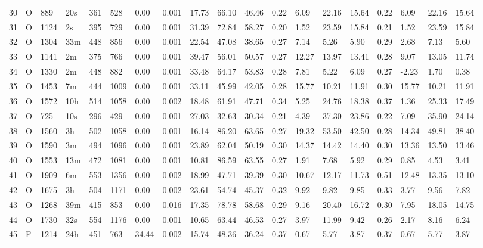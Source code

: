 \begin{tabular}{rllllllrlllllllllll}
30 & O & 889 & 20s & 361 & 528 & 0.00 & 0.001 & 17.73 & 66.10 & 46.46 & 0.22 & 6.09 & 22.16 & 15.64 & 0.22 & 6.09 & 22.16 & 15.64 \\
31 & O & 1124 & 2s & 395 & 729 & 0.00 & 0.001 & 31.39 & 72.84 & 58.27 & 0.20 & 1.52 & 23.59 & 15.84 & 0.21 & 1.52 & 23.59 & 15.84 \\
32 & O & 1304 & 33m & 448 & 856 & 0.00 & 0.001 & 22.54 & 47.08 & 38.65 & 0.27 & 7.14 & 5.26 & 5.90 & 0.29 & 2.68 & 7.13 & 5.60 \\
33 & O & 1141 & 2m & 375 & 766 & 0.00 & 0.001 & 39.47 & 56.01 & 50.57 & 0.27 & 12.27 & 13.97 & 13.41 & 0.28 & 9.07 & 13.05 & 11.74 \\
34 & O & 1330 & 2m & 448 & 882 & 0.00 & 0.001 & 33.48 & 64.17 & 53.83 & 0.28 & 7.81 & 5.22 & 6.09 & 0.27 & -2.23 & 1.70 & 0.38 \\
35 & O & 1453 & 7m & 444 & 1009 & 0.00 & 0.001 & 33.11 & 45.99 & 42.05 & 0.28 & 15.77 & 10.21 & 11.91 & 0.30 & 15.77 & 10.21 & 11.91 \\
36 & O & 1572 & 10h & 514 & 1058 & 0.00 & 0.002 & 18.48 & 61.91 & 47.71 & 0.34 & 5.25 & 24.76 & 18.38 & 0.37 & 1.36 & 25.33 & 17.49 \\
37 & O & 725 & 10s & 296 & 429 & 0.00 & 0.001 & 27.03 & 32.63 & 30.34 & 0.21 & 4.39 & 37.30 & 23.86 & 0.22 & 7.09 & 35.90 & 24.14 \\
38 & O & 1560 & 3h & 502 & 1058 & 0.00 & 0.001 & 16.14 & 86.20 & 63.65 & 0.27 & 19.32 & 53.50 & 42.50 & 0.28 & 14.34 & 49.81 & 38.40 \\
39 & O & 1590 & 3m & 494 & 1096 & 0.00 & 0.001 & 23.89 & 62.04 & 50.19 & 0.30 & 14.37 & 14.42 & 14.40 & 0.30 & 13.36 & 13.50 & 13.46 \\
40 & O & 1553 & 13m & 472 & 1081 & 0.00 & 0.001 & 10.81 & 86.59 & 63.55 & 0.27 & 1.91 & 7.68 & 5.92 & 0.29 & 0.85 & 4.53 & 3.41 \\
41 & O & 1909 & 6m & 553 & 1356 & 0.00 & 0.002 & 18.99 & 47.71 & 39.39 & 0.30 & 10.67 & 12.17 & 11.73 & 0.51 & 12.48 & 13.35 & 13.10 \\
42 & O & 1675 & 3h & 504 & 1171 & 0.00 & 0.002 & 23.61 & 54.74 & 45.37 & 0.32 & 9.92 & 9.82 & 9.85 & 0.33 & 3.77 & 9.56 & 7.82 \\
43 & O & 1268 & 39m & 415 & 853 & 0.00 & 0.016 & 17.35 & 78.78 & 58.68 & 0.29 & 9.16 & 20.40 & 16.72 & 0.30 & 7.95 & 18.05 & 14.75 \\
44 & O & 1730 & 32s & 554 & 1176 & 0.00 & 0.001 & 10.65 & 63.44 & 46.53 & 0.27 & 3.97 & 11.99 & 9.42 & 0.26 & 2.17 & 8.16 & 6.24 \\
45 & F & 1214 & 24h & 451 & 763 & 34.44 & 0.002 & 15.74 & 48.36 & 36.24 & 0.37 & 0.67 & 5.77 & 3.87 & 0.37 & 0.67 & 5.77 & 3.87 \\

\end{tabular}

